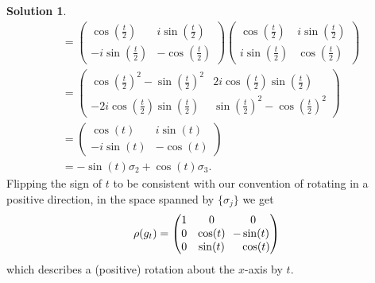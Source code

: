 \documentclass[11pt, a4paper]{report}
\theoremstyle{definition}
\newtheorem{solution}{Solution}[part]
\newenvironment{sol}{\begin{solution}}{\end{solution}\pagebreak[3]}
\newcommand*{\m}{\ensuremath\:\, \mathllap{-}}
\begin{document}
\begin{sol}
\begin{align*}
        &= \begin{pmatrix}
                \cos(\tfrac{t}{2})     & i \sin(\tfrac{t}{2}) \\
                - i \sin(\tfrac{t}{2}) & -\cos(\tfrac{t}{2})
            \end{pmatrix}
            \begin{pmatrix}
                \cos(\tfrac{t}{2})   & i \sin(\tfrac{t}{2}) \\
                i \sin(\tfrac{t}{2}) & \cos(\tfrac{t}{2})
           \end{pmatrix} \\
        &= \begin{pmatrix}
                {\cos(\tfrac{t}{2})}^2 - {\sin(\tfrac{t}{2})}^2
                    & 2 i \cos(\tfrac{t}{2}) \sin(\tfrac{t}{2}) \\
                -2 i \cos(\tfrac{t}{2}) \sin(\tfrac{t}{2})
                    & {\sin(\tfrac{t}{2})}^2 - {\cos(\tfrac{t}{2})}^2
            \end{pmatrix} \\
        &= \begin{pmatrix}
                \cos(t)     & i \sin(t) \\
                - i \sin(t) & -\cos(t)
            \end{pmatrix} \\
        &= - \sin(t) \sigma_2 + \cos(t) \sigma_3.
\end{align*}
Flipping the sign of $t$ to be consistent with our convention of rotating in a positive direction, in the space spanned by $\{\sigma_j\}$ we get
\[
    \rho(g_t) = \begin{pmatrix}
            1 & 0       & 0 \\
            0 & \cos(t) & \m \sin(t) \\
            0 & \sin(t) & \phantom{\m} \cos(t) \\
        \end{pmatrix}
\]
which describes a (positive) rotation about the $x$-axis by $t$.


\end{sol}
\end{document}
